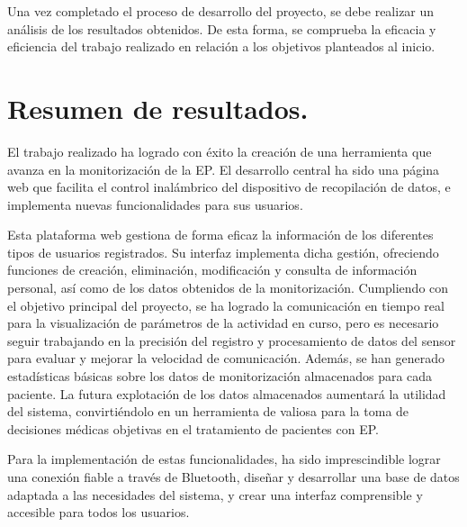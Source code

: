 
Una vez completado el proceso de desarrollo del proyecto, se debe realizar un análisis de los resultados obtenidos. De esta forma, se comprueba la eficacia y eficiencia del trabajo realizado en relación a los objetivos planteados al inicio.

\section{Resumen de resultados.}

El trabajo realizado ha logrado con éxito la creación de una herramienta que avanza en la monitorización de la EP. El desarrollo central ha sido una página web que facilita el control inalámbrico del dispositivo de recopilación de datos, e implementa nuevas funcionalidades para sus usuarios.

Esta plataforma web gestiona de forma eficaz la información de los diferentes tipos de usuarios registrados. Su interfaz implementa dicha gestión, ofreciendo funciones de creación, eliminación, modificación y consulta de información personal, así como de los datos obtenidos de la monitorización. Cumpliendo con el objetivo principal del proyecto, se ha logrado la comunicación en tiempo real para la visualización de parámetros de la actividad en curso, pero es necesario seguir trabajando en la precisión del registro y procesamiento de datos del sensor para evaluar y mejorar la velocidad de comunicación. Además, se han generado estadísticas básicas sobre los datos de monitorización almacenados para cada paciente. La futura explotación de los datos almacenados aumentará la utilidad del sistema, convirtiéndolo en un herramienta de valiosa para la toma de decisiones médicas objetivas en el tratamiento de pacientes con EP.

Para la implementación de estas funcionalidades, ha sido imprescindible lograr una conexión fiable a través de Bluetooth, diseñar y desarrollar una base de datos adaptada a las necesidades del sistema, y crear una interfaz comprensible y accesible para todos los usuarios.

